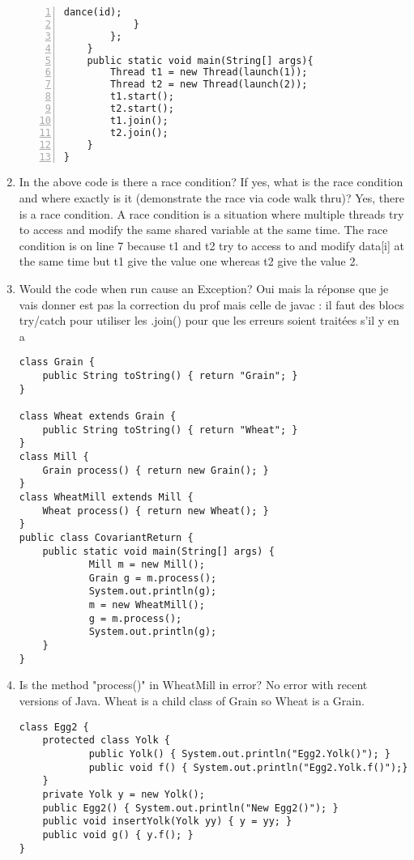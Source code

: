 \documentclass{article}
\begin{document}
\begin{enumerate}
\begin{lstlisting}[numbers=left]
    				dance(id);
   			}
 		};
 	}
 	public static void main(String[] args){
  		Thread t1 = new Thread(launch(1));
  		Thread t2 = new Thread(launch(2));
  		t1.start();
  		t2.start();
  		t1.join();
  		t2.join();
 	}
}
\end{lstlisting}
	\item In the above code is there a race condition? If yes, what is the race condition and where exactly is it (demonstrate the race via code walk thru)?\newline
	Yes, there is a race condition. A race condition is a situation where multiple threads try to access and modify the same shared variable at the same time. The race condition is on line 7 because t1 and t2 try to access to and modify data[i] at the same time but t1 give the value one whereas t2 give the value 2.
	\item Would the code when run cause an Exception?\newline
	Oui mais la réponse que je vais donner est pas la correction du prof mais celle de javac : il faut des blocs try/catch pour utiliser les .join() pour que les erreurs soient traitées s'il y en a
\newpage
\begin{lstlisting}
class Grain {
  	public String toString() { return "Grain"; }
}

class Wheat extends Grain {
  	public String toString() { return "Wheat"; }
}
class Mill {
  	Grain process() { return new Grain(); }
}
class WheatMill extends Mill {
  	Wheat process() { return new Wheat(); }
}
public class CovariantReturn {
  	public static void main(String[] args) {
    		Mill m = new Mill();
    		Grain g = m.process();
    		System.out.println(g);
    		m = new WheatMill();
    		g = m.process();
    		System.out.println(g);
  	}
}
\end{lstlisting}
	\item Is the method "process()" in WheatMill in error?\newline
	No error with recent versions of Java. Wheat is a child class of Grain so Wheat is a Grain.
	\newpage
\begin{lstlisting}
class Egg2 {
  	protected class Yolk {   
    		public Yolk() { System.out.println("Egg2.Yolk()"); }       
    		public void f() { System.out.println("Egg2.Yolk.f()");}
  	}
  	private Yolk y = new Yolk();
  	public Egg2() { System.out.println("New Egg2()"); }
  	public void insertYolk(Yolk yy) { y = yy; }
  	public void g() { y.f(); }
} 


\end{lstlisting}
\end{enumerate}
\end{document}
